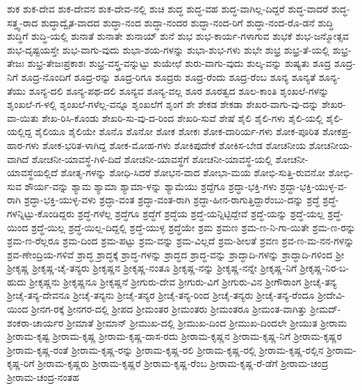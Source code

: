 ಶುಕ
ಶುಕ-ದೇವ
ಶುಕ-ದೇವನ
ಶುಕ-ದೇವ-ನಲ್ಲಿ
ಶುಚಿ
ಶುದ್ಧ
ಶುದ್ಧ-ವಹ
ಶುದ್ಧ-ವಾಗಿಲ್ಲ-ದಿದ್ದರೆ
ಶುದ್ಧ-ವಾದರೆ
ಶುದ್ಧ-ಸತ್ತ್ವ-ರಾದ
ಶುದ್ಧಾದ್ವೈತ-ವಾದದ
ಶುದ್ಧಾ-ನಂದ
ಶುದ್ಧಾ-ನಂದರ
ಶುದ್ಧಾ-ನಂದ-ರಿಗೆ
ಶುದ್ಧಾ-ನಂದ-ರೊ-ಡನೆ
ಶುದ್ಧಿ
ಶುದ್ಧಿಗೆ
ಶುದ್ಧಿ-ಯಲ್ಲಿ
ಶುನಾತೆ
ಶುನಾತೇ
ಶುನಾಯ್
ಶುನೆ
ಶುಭ
ಶುಭ-ಕಾರ್ಯ-ಗಳಾಗುವ
ಶುಭಕೆ
ಶುಭ-ಜನ್ಮೋತ್ಸವ
ಶುಭ-ದೃಷ್ಟಯಸ್ತೇ
ಶುಭ-ವಾಗು-ವುದು
ಶುಭಾ-ಶಯ-ಗಳನ್ನು
ಶುಭಾ-ಶುಭ-ಗಳು
ಶುಭೇ
ಶುಭ್ರ
ಶುಭ್ರ-ತೆ-ಯಲ್ಲಿ
ಶುಭ್ರ-ತೇಜಃ
ಶುಭ್ರ-ತೇಜಃಪ್ರಕಾಶಃ
ಶುಭ್ರ-ವಸ್ತ್ರ-ವನ್ನುಟ್ಟು
ಶುಯೇಛೆ
ಶುರು-ವಾಗು-ವುದು
ಶುಲ್ಕ-ವನ್ನು
ಶುಷ್ಯತು
ಶೂದ್ರ
ಶೂದ್ರ-ನಿಗೆ
ಶೂದ್ರ-ನೊಂದಿಗೆ
ಶೂದ್ರ-ರನ್ನು
ಶೂದ್ರ-ರಿಗೂ
ಶೂದ್ರರು
ಶೂದ್ರ-ರೆಂದು
ಶೂದ್ರ-ರೆಂಬ
ಶೂನ್ಯ
ಶೂನ್ಯತೆ
ಶೂನ್ಯ-ತೆಯು
ಶೂನ್ಯ-ದಲಿ
ಶೂನ್ಯ-ಪಥ-ದಲಿ
ಶೂನ್ಯವ
ಶೂನ್ಯ-ವಲ್ಲ
ಶೂರ
ಶೂರತ್ವದ
ಶೂಲ-ಕಾಂತಿ
ಶೃಂಖಲೆ-ಗಳನ್ನು
ಶೃಂಖಲೆ-ಗ-ಳಲ್ಲಿ
ಶೃಂಖಲೆ-ಗಳೆಲ್ಲ-ವನ್ನೂ
ಶೃಂಖಲೆಗೆ
ಶೃಂಗೆ
ಶೇ
ಶೇಕಡ
ಶೇಕಡಾ
ಶೇಖರ-ವಾಗು-ವು-ದನ್ನು
ಶೇಖರ-ವಾ-ಯಿತು
ಶೇಖ-ರಿಸಿ-ಕೊಂಡು
ಶೇಖರಿ-ಸು-ವು-ದ-ರಿಂದ
ಶೇಖರಿ-ಸುವೆ
ಶೇಷೆ
ಶೈಲಿ
ಶೈಲಿ-ಗಳು
ಶೈಲಿ-ಯಲ್ಲಿ
ಶೈಲಿ-ಯಲ್ಲಿದ್ದ
ಶೈಲಿಯೂ
ಶೈಲಿಯೇ
ಶೊನೊ
ಶೊನೋ
ಶೋಕ
ಶೋಕಃ
ಶೋಕ-ದಾರಿರ್ಯ-ಗಳು
ಶೋಕ-ಪೂರಿತ
ಶೋಕಪ್ರ-ಹಾರ-ಗಳು
ಶೋಕ-ಭರಿತ-ಳಾಗಿದ್ದ
ಶೋಕ-ಮೋಹ-ಗಳು
ಶೋಕಿಪುದೇಕೆ
ಶೋಕಿಸ-ಬೇಡ
ಶೋಚನೀಯ
ಶೋಚನೀಯ-ವಾಗಿದೆ
ಶೋಚನೀ-ಯಾವಸ್ಥೆ-ಗಿಳಿ-ದಿದೆ
ಶೋಚನೀ-ಯಾವಸ್ಥೆಗೆ
ಶೋಚನೀ-ಯಾವಸ್ಥೆ-ಯಲ್ಲಿ
ಶೋಚನೀ-ಯಾವಸ್ಥೆಯಲ್ಲಿದೆ
ಶೋತೃ-ಗಳನ್ನು
ಶೋಧಿ-ಸಿದರೆ
ಶೋಭನ-ವಾದ
ಶೋಭಾ-ಮಯ
ಶೋಭಿ-ಸುತ್ತಿ-ರುವನೋ
ಶೋಭಿ-ಸುವ
ಶೌರ್ಯ-ವನ್ನು
ಶ್ಯಾಮ
ಶ್ಯಾಮಾ
ಶ್ಯಾಮಾ-ಳನ್ನು
ಶ್ಯಾಮೆಯು
ಶ್ರದ್ದೆಗೂ
ಶ್ರದ್ಧಾ-ಭಕ್ತಿ-ಗಳು
ಶ್ರದ್ಧಾ-ಭಕ್ತಿ-ಯುಳ್ಳ-ವ-ರಾಗಿ
ಶ್ರದ್ಧಾ-ಭಕ್ತಿ-ಯುಳ್ಳ-ವಳು
ಶ್ರದ್ಧಾ-ವಂತ
ಶ್ರದ್ಧಾ-ವಂತ-ರಾಗಿ
ಶ್ರದ್ಧಾ-ಹೀನ-ರಾಗುತ್ತಿದ್ದಾರೆಂಬು-ದನ್ನು
ಶ್ರದ್ಧೆ
ಶ್ರದ್ಧೆ-ಗಳನ್ನಿಟ್ಟು-ಕೊಂಡಿದ್ದರು
ಶ್ರದ್ಧೆ-ಗಳೆಲ್ಲ
ಶ್ರದ್ಧೆಗೂ
ಶ್ರದ್ಧೆಗೆ
ಶ್ರದ್ಧೆಯ
ಶ್ರದ್ಧೆ-ಯನ್ನಿಟ್ಟಿದ್ದೇವೆ
ಶ್ರದ್ಧೆ-ಯನ್ನು
ಶ್ರದ್ಧೆ-ಯಲ್ಲ
ಶ್ರದ್ಧೆ-ಯಿಂದ
ಶ್ರದ್ಧೆ-ಯಿಲ್ಲ
ಶ್ರದ್ಧೆ-ಯಿಲ್ಲ-ದಿದ್ದಲ್ಲಿ
ಶ್ರದ್ಧೆ-ಯುಳ್ಳ
ಶ್ರದ್ಧೆಯೇ
ಶ್ರಮ
ಶ್ರಮಣ
ಶ್ರಮ-ಣ-ನಿ-ಗಾ-ಯಿತೇ
ಶ್ರಮ-ಣ-ರನ್ನು
ಶ್ರಮ-ಣ-ರೆಲ್ಲರೂ
ಶ್ರಮ-ದಿಂದ
ಶ್ರಮ-ಪಟ್ಟು
ಶ್ರಮ-ವನ್ನು
ಶ್ರಮ-ವಿಲ್ಲದೆ
ಶ್ರಮ-ಶೀಲತೆ
ಶ್ರವಣ
ಶ್ರವ-ಣ-ಮ-ನನ-ಗಳನ್ನು
ಶ್ರವ-ಣೇಂದ್ರಿಯ-ಗಳಿವೆ
ಶ್ರಾದ್ಧ
ಶ್ರಾದ್ಧಕ್ಕೆ
ಶ್ರಾದ್ಧ-ಗಳನ್ನು
ಶ್ರಾದ್ಧದ
ಶ್ರಾದ್ಧ-ವನ್ನು
ಶ್ರಾದ್ಧಾದಿ-ಗಳನ್ನು
ಶ್ರಾದ್ಧಾದಿ-ಗಳಿಂದ
ಶ್ರೀ
ಶ್ರೀಕೃಷ್ಣ
ಶ್ರೀಕೃಷ್ಣ-ಚೈ-ತನ್ಯರು
ಶ್ರೀಕೃಷ್ಣನ
ಶ್ರೀಕೃಷ್ಣ-ನಂತೂ
ಶ್ರೀಕೃಷ್ಣ-ನನ್ನು
ಶ್ರೀಕೃಷ್ಣ-ನನ್ನೇ
ಶ್ರೀಕೃಷ್ಣ-ನಿಗೆ
ಶ್ರೀಕೃಷ್ಣ-ನಿರ-ಬ-ಹುದು
ಶ್ರೀಕೃಷ್ಣನು
ಶ್ರೀಕೃಷ್ಣನೂ
ಶ್ರೀಕೃಷ್ಣನೆ
ಶ್ರೀಗುರು-ದೇವ
ಶ್ರೀಗುರು-ವಿಗೆ
ಶ್ರೀಗುರು-ವಿನ
ಶ್ರೀಗೌರಾಂಗ
ಶ್ರೀಚೈ-ತನ್ಯ
ಶ್ರೀಚೈ-ತನ್ಯ-ದೇವನೂ
ಶ್ರೀಚೈ-ತನ್ಯನು
ಶ್ರೀಚೈ-ತನ್ಯರ
ಶ್ರೀಚೈ-ತನ್ಯ-ರಿಂದ
ಶ್ರೀಚೈ-ತನ್ಯರು
ಶ್ರೀಚೈ-ತನ್ಯ-ರೆಂದೂ
ಶ್ರೀದೇವಿ-ಯಿಂದ
ಶ್ರೀನಗ-ರಕ್ಕೆ
ಶ್ರೀನಗರ-ದಲ್ಲಿ
ಶ್ರೀಪದ
ಶ್ರೀಮಂತರ
ಶ್ರೀಮಂತರು
ಶ್ರೀಮಂತರೂ
ಶ್ರೀಮಂತ-ವಾಗಿತ್ತು
ಶ್ರೀಮದ್‌-ಶಂಕರಾ-ಚಾರ್ಯರ
ಶ್ರೀಮಾತೆ
ಶ್ರೀಮಾನ್
ಶ್ರೀಮುಖ-ದಲ್ಲಿ
ಶ್ರೀಮುಖ-ದಿಂದ
ಶ್ರೀಮುಖ-ದಿಂದಲೇ
ಶ್ರೀಯುತ
ಶ್ರೀರಾಮ
ಶ್ರೀರಾಮ-ಕೃಷ್ಟ
ಶ್ರೀರಾಮ-ಕೃಷ್ಣ
ಶ್ರೀರಾಮ-ಕೃಷ್ಣ-ದಾಸ-ರದು
ಶ್ರೀರಾಮ-ಕೃಷ್ಣನ
ಶ್ರೀರಾಮ-ಕೃಷ್ಣ-ನಿಗೆ
ಶ್ರೀರಾಮ-ಕೃಷ್ಣರ
ಶ್ರೀರಾಮ-ಕೃಷ್ಣ-ರಂತೆ
ಶ್ರೀರಾಮ-ಕೃಷ್ಣ-ರನ್ನು
ಶ್ರೀರಾಮ-ಕೃಷ್ಣ-ರಲಿ
ಶ್ರೀರಾಮ-ಕೃಷ್ಣ-ರಲ್ಲಿ
ಶ್ರೀರಾಮ-ಕೃಷ್ಣ-ರಲ್ಲಿನ
ಶ್ರೀರಾಮ-ಕೃಷ್ಣ-ರಿಗೆ
ಶ್ರೀರಾಮ-ಕೃಷ್ಣರು
ಶ್ರೀರಾಮ-ಕೃಷ್ಣರೆ
ಶ್ರೀರಾಮ-ಕೃಷ್ಣ-ರೆಂಬ
ಶ್ರೀರಾಮ-ಕೃಷ್ಣ-ರೆ-ಡೆಗೆ
ಶ್ರೀರಾಮ-ಚಂದ್ರ
ಶ್ರೀರಾಮ-ಚಂದ್ರ-ನಂತಹ
